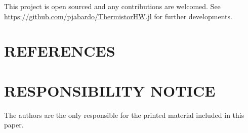 \documentclass[10pt,fleqn,a4paper,twoside]{article}
\begin{document}
This project is open sourced and any contributions are welcomed. See \url{https://github.com/pjabardo/ThermistorHW.jl} for further developments.

\section{REFERENCES} 


\renewcommand{\refname}{}
%


\section{RESPONSIBILITY NOTICE}

The authors are the only responsible for the printed material included in this paper.
\end{document}
